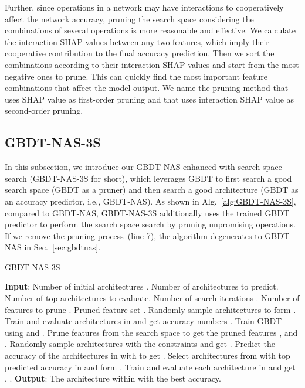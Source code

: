 \documentclass{article}
\begin{document}
Further, since operations in a network may have interactions to cooperatively affect the network accuracy, pruning the search space considering the combinations of several operations is more reasonable and effective. We calculate the interaction SHAP values between any two features, which imply their cooperative contribution to the final accuracy prediction. Then we sort the combinations according to their interaction SHAP values and start from the most negative ones to prune. This can quickly find the most important feature combinations that affect the model output. We name the pruning method that uses SHAP value as first-order pruning and that uses interaction SHAP value as second-order pruning.

\subsection{GBDT-NAS-3S}
In this subsection, we introduce our GBDT-NAS enhanced with search space search (GBDT-NAS-3S for short), which leverages GBDT to first search a good search space (GBDT as a pruner) and then search a good architecture (GBDT as an accuracy predictor, i.e., GBDT-NAS). As shown in Alg.~\ref{alg:GBDT-NAS-3S}, compared to GBDT-NAS, GBDT-NAS-3S additionally uses the trained GBDT predictor  to perform the search space search by pruning unpromising operations. If we remove the pruning process~(line 7), the algorithm degenerates to GBDT-NAS in Sec.~\ref{sec:gbdtnas}.

\begin{algorithm}[ht]
\small
\caption{GBDT-NAS-3S}
\label{alg:GBDT-NAS-3S}
\begin{algorithmic}[1]
\STATE \textbf{Input}: Number of initial architectures . Number of architectures  to predict. Number of top architectures  to evaluate. Number of search iterations . Number of features to prune .
\STATE Pruned feature set .
\STATE Randomly sample  architectures to form .
\STATE Train and evaluate architectures in  and get accuracy numbers .
\FOR {}
\STATE Train GBDT  using  and .
\STATE Prune  features from the search space to get the pruned features , and .
\STATE Randomly sample  architectures with the constraints  and get .
\STATE Predict the accuracy of the architectures in  with  to get .
\STATE Select architectures from  with top  predicted accuracy in  and form .
\STATE Train and evaluate each architecture in  and get .
\STATE .
\ENDFOR
\STATE \textbf{Output}: The architecture within  with the best accuracy.
\end{algorithmic}
\end{algorithm}
\end{document}
